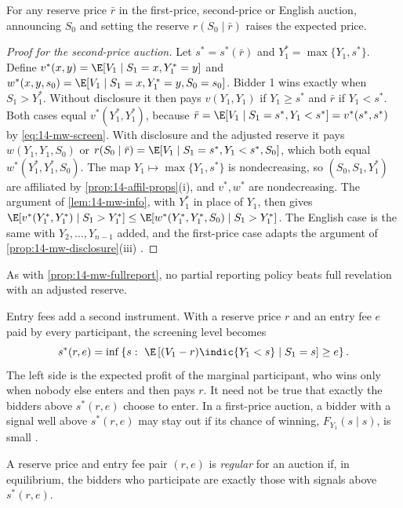 \begin{proposition}\label{prop:14-mw-reserve-info}
For any reserve price $\bar r$ in the first-price, second-price or English auction, announcing $S_0$ and
setting the reserve $r(S_0\mid\bar r)$ raises the expected price.
\end{proposition}

\begin{proof}[Proof for the second-price auction]
Let $s^*=s^*(\bar r)$ and $Y_1^*=\max\{Y_1,s^*\}$. Define $v^*(x,y)=\E[V_1\mid S_1=x,Y^*_1=y]$ and
$w^*(x,y,s_0)=\E[V_1\mid S_1=x,Y^*_1=y,S_0=s_0]$. Bidder 1 wins exactly when $S_1>Y_1^*$. Without disclosure
it then pays $v(Y_1,Y_1)$ if $Y_1\ge s^*$ and $\bar r$ if $Y_1<s^*$. Both cases equal $v^*(Y^*_1,Y^*_1)$,
because $\bar r=\E[V_1\mid S_1=s^*,Y_1<s^*]=v^*(s^*,s^*)$ by \eqref{eq:14-mw-screen}. With disclosure and the
adjusted reserve it pays $w(Y_1,Y_1,S_0)$ or $r(S_0\mid\bar r)=\E[V_1\mid S_1=s^*,Y_1<s^*,S_0]$, which both
equal $w^*(Y_1^*,Y_1^*,S_0)$. The map $Y_1\mapsto\max\{Y_1,s^*\}$ is nondecreasing, so $(S_0,S_1,Y_1^*)$ are
affiliated by \cref{prop:14-affil-props}(i), and $v^*,w^*$ are nondecreasing. The argument of
\cref{lem:14-mw-info}, with $Y^*_1$ in place of $Y_1$, then gives $\E[v^*(Y_1^*,Y_1^*)\mid S_1>Y_1^*]\le
\E[w^*(Y_1^*,Y_1^*,S_0)\mid S_1>Y_1^*]$. The English case is the same with $Y_2,\dots,Y_{n-1}$ added, and the
first-price case adapts the argument of \cref{prop:14-mw-disclosure}(iii) \citep[p.~1112]{MilgromWeber1982}.
\end{proof}

As with \cref{prop:14-mw-fullreport}, no partial reporting policy beats full revelation with an adjusted
reserve.

Entry fees add a second instrument. With a reserve price $r$ and an entry fee $e$ paid by every participant,
the screening level becomes
\begin{equation*}
  s^*(r,e)=\inf\left\{s:\ \E\left[(V_1-r)\indic\{Y_1<s\}\mid S_1=s\right]\ge e\right\}.
\end{equation*}
The left side is the expected profit of the marginal participant, who wins only when nobody else enters and
then pays $r$. It need not be true that exactly the bidders above $s^*(r,e)$ choose to enter. In a first-price
auction, a bidder with a signal well above $s^*(r,e)$ may stay out if its chance of winning,
$F_{Y_1}(s\mid s)$, is small \citep[p.~1112]{MilgromWeber1982}.

\begin{definition}\label{def:14-regular-pair}
A reserve price and entry fee pair $(r,e)$ is \emph{regular} for an auction if, in equilibrium, the bidders who
participate are exactly those with signals above $s^*(r,e)$.
\end{definition}

